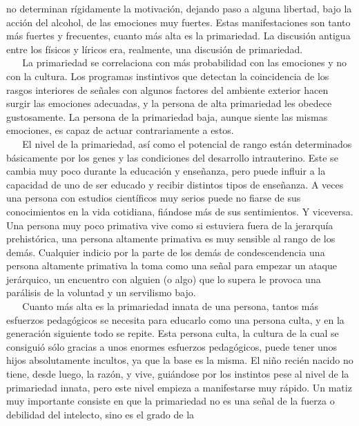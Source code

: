 no determinan rígidamente la motivación, dejando paso a alguna libertad,
bajo la acción del alcohol, de las emociones muy fuertes. Estas
manifestaciones son tanto más fuertes y frecuentes, cuanto más alta es
la primariedad. La discusión antigua entre los físicos y líricos era,
realmente, una discusión de primariedad.\\
\hspace*{0.333em} ~ ~ La primariedad se correlaciona con más
probabilidad con las emociones y no con la cultura. Los programas
instintivos que detectan la coincidencia de los rasgos interiores de
señales con algunos factores del ambiente exterior hacen surgir las
emociones adecuadas, y la persona de alta primariedad les obedece
gustosamente. La persona de la primariedad baja, aunque siente las
mismas emociones, es capaz de actuar contrariamente a estos.\\
\hspace*{0.333em} ~ ~ El nivel de la primariedad, así como el potencial
de rango están determinados básicamente por los genes y las condiciones
del desarrollo intrauterino. Este se cambia muy poco durante la
educación y enseñanza, pero puede influir a la capacidad de uno de ser
educado y recibir distintos tipos de enseñanza. A veces una persona con
estudios científicos muy serios puede no fiarse de sus conocimientos en
la vida cotidiana, fiándose más de sus sentimientos. Y viceversa. Una
persona muy poco primativa vive como si estuviera fuera de la jerarquía
prehistórica, una persona altamente primativa es muy sensible al rango
de los demás. Cualquier indicio por la parte de los demás de
condescendencia una persona altamente primativa la toma como una señal
para empezar un ataque jerárquico, un encuentro con alguien (o algo) que
lo supera le provoca una parálisis de la voluntad y un servilismo bajo.\\
\hspace*{0.333em} ~ ~ Cuanto más alta es la primariedad innata de una
persona, tantos más esfuerzos pedagógicos se necesita para educarlo como
una persona culta, y en la generación siguiente todo se repite. Esta
persona culta, la cultura de la cual se consiguió sólo gracias a unos
enormes esfuerzos pedagógicos, puede tener unos hijos absolutamente
incultos, ya que la base es la misma. El niño recién nacido no tiene,
desde luego, la razón, y vive, guiándose por los instintos pese al nivel
de la primariedad innata, pero este nivel empieza a manifestarse muy
rápido. Un matiz muy importante consiste en que la primariedad no es una
señal de la fuerza o debilidad del intelecto, sino es el grado de la
